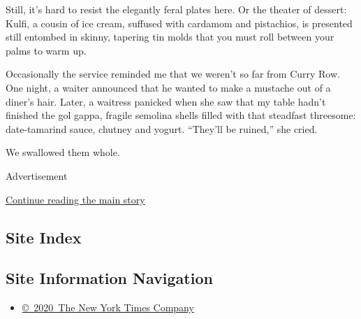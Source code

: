 Still, it's hard to resist the elegantly feral plates here. Or the
theater of dessert: Kulfi, a cousin of ice cream, suffused with cardamom
and pistachios, is presented still entombed in skinny, tapering tin
molds that you must roll between your palms to warm up.

Occasionally the service reminded me that we weren't so far from Curry
Row. One night, a waiter announced that he wanted to make a mustache out
of a diner's hair. Later, a waitress panicked when she saw that my table
hadn't finished the gol gappa, fragile semolina shells filled with that
steadfast threesome: date-tamarind sauce, chutney and yogurt. ``They'll
be ruined,'' she cried.

We swallowed them whole.

Advertisement

\protect\hyperlink{after-bottom}{Continue reading the main story}

\hypertarget{site-index}{%
\subsection{Site Index}\label{site-index}}

\hypertarget{site-information-navigation}{%
\subsection{Site Information
Navigation}\label{site-information-navigation}}

\begin{itemize}
\tightlist
\item
  \href{https://help.nytimes3xbfgragh.onion/hc/en-us/articles/115014792127-Copyright-notice}{©~2020~The
  New York Times Company}
\end{itemize}

